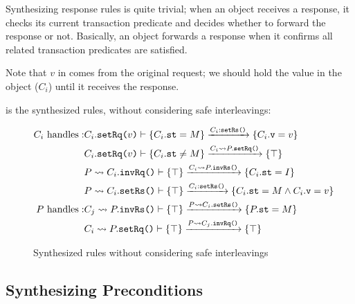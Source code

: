 \documentclass[format=manuscript]{acmart}
\begin{document}
\begin{center}
\end{center}

Synthesizing response rules is quite trivial; when an object receives a
response, it checks its current transaction predicate and decides whether to
forward the response or not. Basically, an object forwards a response when it
confirms all related transaction predicates are satisfied.

\begin{center}
\end{center}

\begin{center}
\end{center}

Note that $v$ in  comes from the original request; we should
hold the value in the object ($C_i$) until it receives the response.

 is the synthesized rules, without
considering safe interleavings:

\begin{figure}[h]
  \begin{eqnarray*}
    C_i\ \textrm{handles}: &
    C_i.\texttt{setRq(}v\texttt{)}\vdash \{ C_i.\texttt{st} = M \} \xrightarrow{C_i:\texttt{setRs()}} \{ C_i.\texttt{v} = v \} \\
    & C_i.\texttt{setRq(}v\texttt{)}\vdash \{ C_i.\texttt{st} \neq M \} \xrightarrow{C_i \leadsto P.\texttt{setRq()}} \{ \top \} \\
    & P \leadsto C_i.\texttt{invRq()}\vdash \{ \top \} \xrightarrow{C_i \leadsto P.\texttt{invRs()}} \{ C_i.\texttt{st} = I \} \\
    & P \leadsto C_i.\texttt{setRs()}\vdash \{ \top \} \xrightarrow{C_i:\texttt{setRs()}} \{ C_i.\texttt{st} = M \wedge C_i.\texttt{v} = v \} \\
    P\ \textrm{handles}: &
    C_j \leadsto P.\texttt{invRs()}\vdash \{ \top \} \xrightarrow{P \leadsto C_i.\texttt{setRs()}} \{ P.\texttt{st} = M \} \\
    & C_i \leadsto P.\texttt{setRq()}\vdash \{ \top \} \xrightarrow{P \leadsto C_j.\texttt{invRq()}} \{ \top \} \\
  \end{eqnarray*}
  \caption{Synthesized rules without considering safe interleavings}
  \label{fig:synthesized-rules-naive}
\end{figure}

\subsection{Synthesizing Preconditions}
\end{document}
